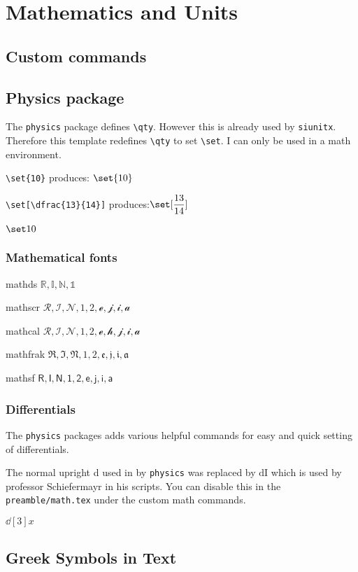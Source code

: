 \section{Mathematics and Units}


\begingroup \small
\subsection{Custom commands}

\I

\subsection{Physics package}

The \verb|physics| package defines \verb|\qty|. However this is already used by \texttt{siunitx}. Therefore this template redefines \verb|\qty| to set \verb|\set|. I can only be used in a math environment.


\verb|\set{10}| produces: $\set{10}$

\verb|\set[\dfrac{13}{14}]|     produces:$\set[\dfrac{13}{14}]$

$\set10 $

\subsubsection{Mathematical fonts}

mathds $\mathds{R, I, N, 1}$

mathscr $\mathscr{R, I, N, 1, 2, e, j, i, a}$

mathcal $\mathcal{R, I, N, 1, 2, e,h, j, i, a}$

mathfrak $\mathfrak{R, I, N, 1, 2, e, j, i, a}$

mathsf $\mathsf{R, I, N, 1, 2, e, j, i, a}$


\subsubsection{Differentials}

The \texttt{physics} packages adds various helpful commands for easy and quick setting of differentials.

The normal upright d used in by \texttt{physics} was replaced by $\mathrm{d\!I}$ which is used by professor Schiefermayr in his scripts. You can disable this in the \texttt{preamble/math.tex} under the custom math commands.

 $\dd[3]{x}$

\subsection{Greek Symbols in Text}

